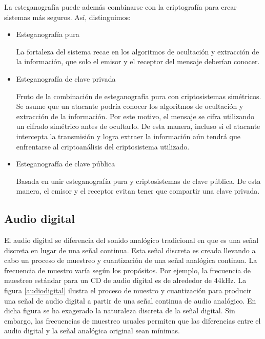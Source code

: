 \documentclass[12pt]{article}
\begin{document}
La esteganografía puede además combinarse con la criptografía para crear sistemas más seguros. Así, distinguimos:

\begin{itemize}

\item Esteganografía pura

La fortaleza del sistema recae en los algoritmos de ocultación y extracción de la información, que solo el emisor y el receptor del mensaje deberían conocer.

\item Esteganografía de clave privada

Fruto de la combinación de esteganografía pura con criptosistemas simétricos. Se asume que un atacante podría conocer los algoritmos de ocultación y extracción de la información. Por este motivo, el mensaje se cifra utilizando un cifrado simétrico antes de ocultarlo. De esta manera, incluso si el atacante intercepta la transmisión y logra extraer la información aún tendrá que enfrentarse al criptoanálisis del criptosistema utilizado.

\item Esteganografía de clave pública

Basada en unir esteganografía pura y criptosistemas de clave pública. De esta manera, el emisor y el receptor evitan tener que compartir una clave privada.

\end{itemize}

\subsection{Audio digital}

El audio digital se diferencia del sonido analógico tradicional en que es una señal discreta en lugar de una señal continua. Esta señal discreta es creada llevando a cabo un proceso de muestreo y cuantización de una señal analógica continua. La frecuencia de muestro varía según los propósitos. Por ejemplo, la frecuencia de muestreo estándar para un CD de audio digital es de alrededor de 44kHz. La figura \ref{audiodigital} ilustra el proceso de muestro y cuantización para producir una señal de audio digital a partir de una señal continua de audio analógico.
En dicha figura se ha exagerado la naturaleza discreta de la señal digital. Sin embargo, las frecuencias de muestreo usuales permiten que las diferencias entre el audio digital y la señal analógica original sean mínimas.
\end{document}
